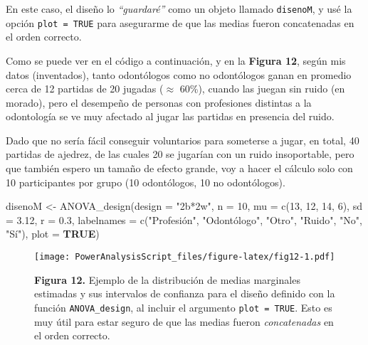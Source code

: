 \documentclass[
]{article}
\newenvironment{Shaded}{\begin{snugshade}}{\end{snugshade}}
\newcommand{\AttributeTok}[1]{\textcolor[rgb]{0.16,0.50,0.73}{#1}}
\newcommand{\ConstantTok}[1]{\textcolor[rgb]{0.15,0.68,0.68}{\textbf{#1}}}
\newcommand{\DecValTok}[1]{\textcolor[rgb]{0.96,0.45,0.00}{#1}}
\newcommand{\FloatTok}[1]{\textcolor[rgb]{0.96,0.45,0.00}{#1}}
\newcommand{\FunctionTok}[1]{\textcolor[rgb]{0.56,0.27,0.68}{#1}}
\newcommand{\NormalTok}[1]{\textcolor[rgb]{0.81,0.81,0.76}{#1}}
\newcommand{\OtherTok}[1]{\textcolor[rgb]{0.15,0.68,0.38}{#1}}
\newcommand{\StringTok}[1]{\textcolor[rgb]{0.96,0.31,0.31}{#1}}
\begin{document}
En este caso, el diseño lo \emph{``guardaré''} como un objeto llamado
\texttt{disenoM}, y usé la opción \texttt{plot\ =\ TRUE} para asegurarme
de que las medias fueron concatenadas en el orden correcto.

Como se puede ver en el código a continuación, y en la \textbf{Figura
12}, según mis datos (inventados), tanto odontólogos como no odontólogos
ganan en promedio cerca de 12 partidas de 20 jugadas (\(\approx\) 60\%),
cuando las juegan sin ruido (en morado), pero el desempeño de personas
con profesiones distintas a la odontología se ve muy afectado al jugar
las partidas en presencia del ruido.

Dado que no sería fácil conseguir voluntarios para someterse a jugar, en
total, 40 partidas de ajedrez, de las cuales 20 se jugarían con un ruido
insoportable, pero que también espero un tamaño de efecto grande, voy a
hacer el cálculo solo con 10 participantes por grupo (10 odontólogos, 10
no odontólogos).

\begin{Shaded}
\begin{Highlighting}[]
\NormalTok{disenoM }\OtherTok{\textless{}{-}} \FunctionTok{ANOVA\_design}\NormalTok{(}\AttributeTok{design =} \StringTok{"2b*2w"}\NormalTok{,}
                        \AttributeTok{n =} \DecValTok{10}\NormalTok{, }
                        \AttributeTok{mu =} \FunctionTok{c}\NormalTok{(}\DecValTok{13}\NormalTok{, }\DecValTok{12}\NormalTok{, }\DecValTok{14}\NormalTok{, }\DecValTok{6}\NormalTok{),}
                        \AttributeTok{sd =} \FloatTok{3.12}\NormalTok{,}
                        \AttributeTok{r =} \FloatTok{0.3}\NormalTok{,}
                        \AttributeTok{labelnames =} \FunctionTok{c}\NormalTok{(}\StringTok{"Profesión"}\NormalTok{, }\StringTok{"Odontólogo"}\NormalTok{, }\StringTok{"Otro"}\NormalTok{, }\StringTok{"Ruido"}\NormalTok{, }\StringTok{"No"}\NormalTok{, }\StringTok{"Sí"}\NormalTok{),}
                        \AttributeTok{plot =} \ConstantTok{TRUE}\NormalTok{)}
\end{Highlighting}
\end{Shaded}

\begin{figure}
\centering
\texttt{[image: PowerAnalysisScript\_files/figure-latex/fig12-1.pdf]}
\caption{\textbf{Figura 12.} Ejemplo de la distribución de medias
marginales estimadas y sus intervalos de confianza para el diseño
definido con la función \texttt{ANOVA\_design}, al incluir el argumento
\texttt{plot\ =\ TRUE}. Esto es muy útil para estar seguro de que las
medias fueron \emph{concatenadas} en el orden correcto.}
\end{figure}
\end{document}
